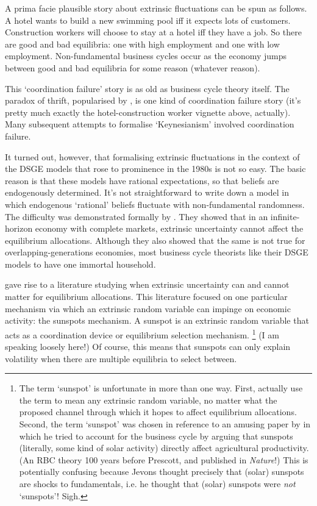 \documentclass[11pt,letterpaper,reqno,oneside]{article}
\begin{document}
A prima facie plausible story about extrinsic fluctuations can be spun as follows. A hotel wants to build a new swimming pool iff it expects lots of customers. Construction workers will choose to stay at a hotel iff they have a job. So there are good and bad equilibria: one with high employment and one with low employment. Non-fundamental business cycles occur as the economy jumps between good and bad equilibria for some reason (whatever reason).

This `coordination failure' story is as old as business cycle theory itself. The paradox of thrift, popularised by \textcite{Keynes1936}, is one kind of coordination failure story (it's pretty much exactly the hotel-construction worker vignette above, actually). Many subsequent attempts to formalise `Keynesianism' involved coordination failure.

It turned out, however, that formalising extrinsic fluctuations in the context of the DSGE models that rose to prominence in the 1980s is not so easy. The basic reason is that these models have rational expectations, so that beliefs are endogenously determined. It's not straightforward to write down a model in which endogenous `rational' beliefs fluctuate with non-fundamental randomness. The difficulty was demonstrated formally by \textcite{CassShell1983}. They showed that in an infinite-horizon economy with complete markets, extrinsic uncertainty cannot affect the equilibrium allocations. Although they also showed that the same is not true for overlapping-generations economies, most business cycle theorists like their DSGE models to have one immortal household.

\textcite{CassShell1983} gave rise to a literature studying when extrinsic uncertainty can and cannot matter for equilibrium allocations. This literature focused on one particular mechanism via which an extrinsic random variable can impinge on economic activity: the sunspots mechanism. A sunspot is an extrinsic random variable that acts as a coordination device or equilibrium selection mechanism.%
	\footnote{The term `sunspot' is unfortunate in more than one way. First, \textcite{CassShell1983} actually use the term to mean any extrinsic random variable, no matter what the proposed channel through which it hopes to affect equilibrium allocations. Second, the term `sunspot' was chosen in reference to an amusing paper by \textcite{Jevons1878} in which he tried to account for the business cycle by arguing that sunspots (literally, some kind of solar activity) directly affect agricultural productivity. (An RBC theory 100 years before Prescott, and published in \emph{Nature}!) This is potentially confusing because Jevons thought precisely that (solar) sunspots are shocks to fundamentals, i.e. he thought that (solar) sunspots were \emph{not} `sunspots'! Sigh.}
(I am speaking loosely here!) Of course, this means that sunspots can only explain volatility when there are multiple equilibria to select between.
\end{document}
